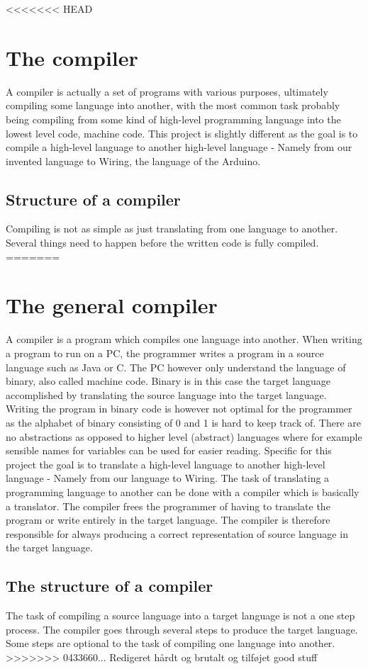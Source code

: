 <<<<<<< HEAD
\section{The compiler}
A compiler is actually a set of programs with various purposes, ultimately compiling some language into another, with the most common task probably being compiling from some kind of high-level programming language into the lowest level code, machine code. This project is slightly different as the goal is to compile a high-level language to another high-level language - Namely from our invented language to Wiring, the language of the Arduino.
\subsection{Structure of a compiler}
Compiling is not as simple as just translating from one language to another. Several things need to happen before the written code is fully compiled.\cite{compiler:structure}\\
=======
\section{The general compiler}
A compiler is a program which compiles one language into another. When writing a program to run on a PC, the programmer writes a program in a source language such as Java or C. The PC however only understand the language of binary, also called machine code. Binary is in this case the target language accomplished by translating the source language into the target language. Writing the program in binary code is however not optimal for the programmer as the alphabet of binary consisting of 0 and 1 is hard to keep track of. There are no abstractions as opposed to higher level (abstract) languages where for example sensible names for variables can be used for easier reading. Specific for this project the goal is to translate a high-level language to another high-level language - Namely from our language to Wiring. The task of translating a programming language to another can be done with a compiler which is basically a translator. The compiler frees the programmer of having to translate the program or write entirely in the target language. The compiler is therefore responsible for always producing a correct representation of source language in the target language.
\subsection{The structure of a compiler}
The task of compiling a source language into a target language is not a one step process. The compiler goes through several steps to produce the target language. Some steps are optional to the task of compiling one language into another.\cite{compiler:structure}\\
>>>>>>> 0433660... Redigeret hårdt og brutalt og tilføjet good stuff

